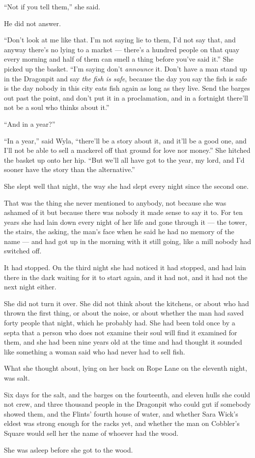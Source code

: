 “Not if you tell them,” she said.

He did not answer.

“Don’t look at me like that. I’m not saying lie to them, I’d not say that, and anyway there’s no lying to a market — there’s a hundred people on that quay every morning and half of them can smell a thing before you’ve said it.” She picked up the basket. “I’m saying don’t \textit{announce} it. Don’t have a man stand up in the Dragonpit and say \textit{the fish is safe}, because the day you say the fish is safe is the day nobody in this city eats fish again as long as they live. Send the barges out past the point, and don’t put it in a proclamation, and in a fortnight there’ll not be a soul who thinks about it.”

“And in a year?”

“In a year,” said Wyla, “there’ll be a story about it, and it’ll be a good one, and I’ll not be able to sell a mackerel off that ground for love nor money.” She hitched the basket up onto her hip. “But we’ll all have got to the year, my lord, and I’d sooner have the story than the alternative.”

\sceneBreak

She slept well that night, the way she had slept every night since the second one.

That was the thing she never mentioned to anybody, not because she was ashamed of it but because there was nobody it made sense to say it to. For ten years she had lain down every night of her life and gone through it — the tower, the stairs, the asking, the man’s face when he said he had no memory of the name — and had got up in the morning with it still going, like a mill nobody had switched off.

It had stopped. On the third night she had noticed it had stopped, and had lain there in the dark waiting for it to start again, and it had not, and it had not the next night either.

She did not turn it over. She did not think about the kitchens, or about who had thrown the first thing, or about the noise, or about whether the man had saved forty people that night, which he probably had. She had been told once by a septa that a person who does not examine their soul will find it examined for them, and she had been nine years old at the time and had thought it sounded like something a woman said who had never had to sell fish.

What she thought about, lying on her back on Rope Lane on the eleventh night, was salt.

Six days for the salt, and the barges on the fourteenth, and eleven hulls she could not crew, and three thousand people in the Dragonpit who could gut if somebody showed them, and the Flints’ fourth house of water, and whether Sara Wick’s eldest was strong enough for the racks yet, and whether the man on Cobbler’s Square would sell her the name of whoever had the wood.

She was asleep before she got to the wood.